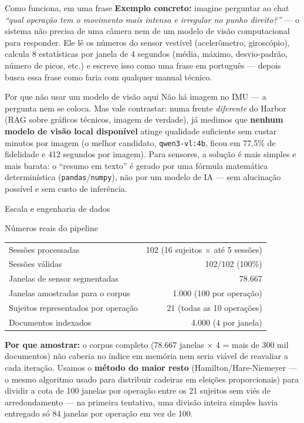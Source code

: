 \documentclass{beamer}
\newenvironment{numerobloco}[1]{\begin{block}{#1}}{\end{block}}
\begin{document}
\begin{frame}{Como funciona, em uma frase}
  \small
  \textbf{Exemplo concreto:} imagine perguntar ao chat \emph{``qual operação tem o movimento
  mais intenso e irregular no punho direito?''} — o sistema não precisa de uma câmera nem de um
  modelo de visão computacional para responder. Ele lê os números do sensor vestível
  (acelerômetro, giroscópio), calcula 8 estatísticas por janela de 4 segundos (média, máximo,
  desvio-padrão, número de picos, etc.) e escreve isso como uma frase em português — depois
  busca essa frase como faria com qualquer manual técnico.

  \pause
  \begin{numerobloco}{Por que não usar um modelo de visão aqui}
    Não há imagem no IMU — a pergunta nem se coloca. Mas vale contrastar: numa frente
    \emph{diferente} do Harbor (RAG sobre gráficos técnicos, imagem de verdade), já medimos que
    \textbf{nenhum modelo de visão local disponível} atinge qualidade suficiente sem custar
    minutos por imagem (o melhor candidato, \texttt{qwen3-vl:4b}, ficou em 77,5\% de fidelidade
    e 412 segundos por imagem). Para sensores, a solução é mais simples e mais barata: o
    ``resumo em texto'' é gerado por uma fórmula matemática determinística
    (\texttt{pandas}/\texttt{numpy}), não por um modelo de IA — sem alucinação possível e sem
    custo de inferência.
  \end{numerobloco}
\end{frame}

\begin{frame}{Escala e engenharia de dados}
  \small
  \begin{numerobloco}{Números reais do pipeline}
    \begin{center}
    \begin{tabular}{lr}
      \toprule
      Sessões processadas & 102 (16 sujeitos $\times$ até 5 sessões) \\
      Sessões válidas & 102/102 (100\%) \\
      Janelas de sensor segmentadas & 78.667 \\
      Janelas amostradas para o corpus & 1.000 (100 por operação) \\
      Sujeitos representados por operação & 21 (todas as 10 operações) \\
      Documentos indexados & 4.000 (4 por janela) \\
      \bottomrule
    \end{tabular}
    \end{center}
  \end{numerobloco}

  \pause
  \textbf{Por que amostrar:} o corpus completo (78.667 janelas $\times$ 4 = mais de 300 mil
  documentos) não caberia no índice em memória nem seria viável de reavaliar a cada iteração.
  Usamos o \textbf{método do maior resto} (Hamilton/Hare-Niemeyer — o mesmo algoritmo usado
  para distribuir cadeiras em eleições proporcionais) para dividir a cota de 100 janelas por
  operação entre os 21 sujeitos sem viés de arredondamento — na primeira tentativa, uma divisão
  inteira simples havia entregado só 84 janelas por operação em vez de 100.
\end{frame}
\end{document}
